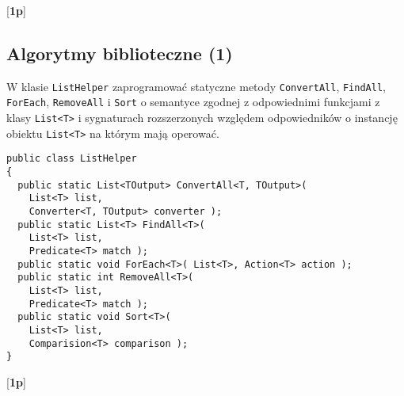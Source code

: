   [{\bf 1p}]

\subsection{Algorytmy biblioteczne (1)}

  W klasie {\tt ListHelper} 
\label{algorytmy_biblioteczne}  
  zaprogramować statyczne metody {\tt ConvertAll}, {\tt FindAll},  {\tt ForEach},  {\tt RemoveAll} i {\tt Sort} 
  o semantyce zgodnej z odpowiednimi funkcjami z klasy {\tt List<T>} i sygnaturach rozszerzonych względem odpowiedników
  o instancję obiektu {\tt List<T>} na którym mają operować. 
        
\begin{verbatim}
public class ListHelper
{
  public static List<TOutput> ConvertAll<T, TOutput>( 
    List<T> list, 
    Converter<T, TOutput> converter );
  public static List<T> FindAll<T>( 
    List<T> list, 
    Predicate<T> match );
  public static void ForEach<T>( List<T>, Action<T> action );
  public static int RemoveAll<T>( 
    List<T> list, 
    Predicate<T> match );
  public static void Sort<T>( 
    List<T> list, 
    Comparision<T> comparison );    
}
\end{verbatim}

  [{\bf 1p}]

